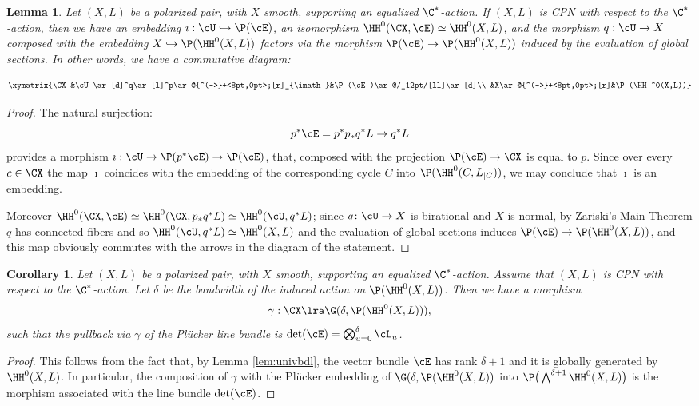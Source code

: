 \documentclass[reqno]{amsproc}
\newtheorem{lemma}[theorem]{Lemma}
\newtheorem{corollary}[theorem]{Corollary}
\theoremstyle{definition}
\begin{document}
\begin{lemma}\label{lem:CPNprop}
Let $(X,L)$ be a polarized pair, with $X$ smooth, supporting an equalized $\C^*$-action. If $(X,L)$ is CPN with respect to the $\C^*$-action, then we have an embedding $\imath:\cU\hookrightarrow\P(\cE)$, an isomorphism $\HH^0(\CX,\cE)\simeq \HH^0(X,L)$, and the morphism $q:\cU\to X$  composed with the embedding $X\hookrightarrow \P(\HH^0(X,L))$ factors via the morphism $\P(\cE)\to \P(\HH^0(X,L))$ induced by the evaluation of global sections. In other words, we have a commutative diagram:

$$
\xymatrix{\CX&\cU\ar[d]^q\ar[l]^p\ar@{^(->}+<8pt,0pt>;[r]_{\imath}&\P(\cE)\ar@/_12pt/[ll]\ar[d]\\
&X\ar@{^(->}+<8pt,0pt>;[r]&\P(\HH^0(X,L))}
$$


\end{lemma}

\begin{proof}
The natural surjection:
$$
p^*\cE=p^*p_*q^*L\to q^*L
$$
provides a morphism $\imath:\cU\to\P(p^*\cE)\to \P(\cE)$, that, composed with the projection $\P(\cE)\to \CX$ is equal to $p$. Since over every $c\in\CX$ the map $\imath$ coincides with the embedding of the corresponding cycle $C$ into $\P(\HH^0(C,L_{|C}))$, we may conclude that $\imath$ is an embedding. 

Moreover $\HH^0(\CX,\cE)\simeq\HH^0(\CX,p_*q^*L)\simeq\HH^0(\cU,q^*L)$; since $q\colon \cU\to X$ is birational and $X$ is normal, by Zariski's Main Theorem $q$ has connected fibers and so $\HH^0(\cU,q^*L)\simeq \HH^0(X,L)$ and the evaluation of global sections induces $\P(\cE)\to \P(\HH^0(X,L))$, and this map obviously commutes with the arrows in the diagram of the statement.
\end{proof}

\begin{corollary}\label{cor:chowgrass}
Let $(X,L)$ be a polarized pair, with $X$ smooth, supporting an equalized $\C^*$-action. Assume that $(X,L)$ is CPN with respect to the $\C^*$-action. Let $\delta$ be the bandwidth of the induced action on $\P(\HH^0(X,L))$. Then we have a  
morphism $$\gamma:\CX\lra  
\G(\delta,\P(\HH^0(X,L))),$$
such that the pullback via $\gamma$ of the Pl\"ucker line bundle is $\det(\cE)=\bigotimes_{u=0}^\delta \cL_u$.
\end{corollary}

\begin{proof}
This follows from the fact that, by Lemma \ref{lem:univbdl}, the vector bundle $\cE$ has rank $\delta+1$ and it is globally generated by $\HH^0(X,L)$. In particular, the composition of  $\gamma$ with the Pl\"ucker embedding of $\G(\delta,\P(\HH^0(X,L))$ into $\P\big(\bigwedge^{\delta+1}\HH^0(X,L)\big)$ is the morphism associated with the line bundle $\det (\cE)$.
\end{proof}
\end{document}

